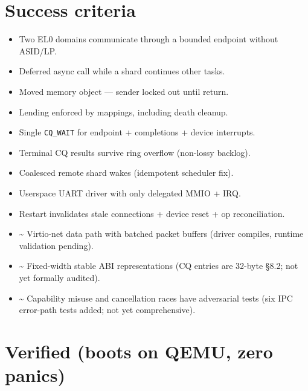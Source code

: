 \section{Success criteria}

\begin{itemize}
    \item[1.] \checkmark Two EL0 domains communicate through a bounded endpoint
        without ASID/LP.
    \item[2.] \checkmark Deferred async call while a shard continues other tasks.
    \item[3.] \checkmark Moved memory object --- sender locked out until return.
    \item[4.] \checkmark Lending enforced by mappings, including death cleanup.
    \item[5.] \checkmark Single \texttt{CQ\_WAIT} for endpoint + completions +
        device interrupts.
    \item[6.] \checkmark Terminal CQ results survive ring overflow (non-lossy
        backlog).
    \item[7.] \checkmark Coalesced remote shard wakes (idempotent scheduler fix).
    \item[8.] \checkmark Userspace UART driver with only delegated MMIO + IRQ.
    \item[9.] \checkmark Restart invalidates stale connections + device reset +
        op reconciliation.
    \item[10.] \textasciitilde{} Virtio-net data path with batched packet
        buffers (driver compiles, runtime validation pending).
    \item[11.] \textasciitilde{} Fixed-width stable ABI representations (CQ
        entries are 32-byte \S8.2; not yet formally audited).
    \item[12.] \textasciitilde{} Capability misuse and cancellation races have
        adversarial tests (six IPC error-path tests added; not yet
        comprehensive).
\end{itemize}

\section{Verified (boots on QEMU, zero panics)}

